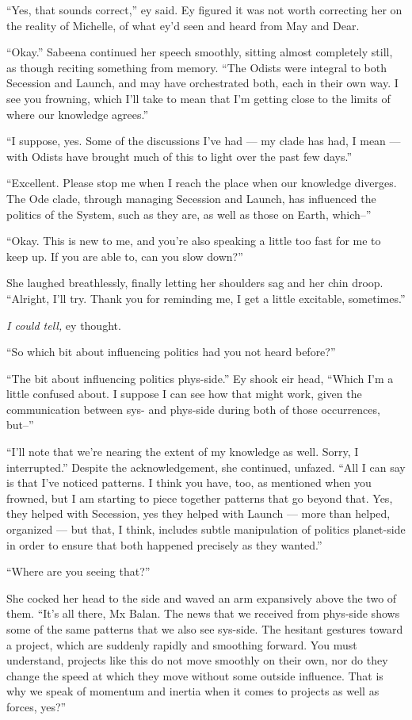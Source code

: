 ``Yes, that sounds correct,'' ey said. Ey figured it was not worth correcting her on the reality of Michelle, of what ey'd seen and heard from May and Dear.

``Okay.'' Sabeena continued her speech smoothly, sitting almost completely still, as though reciting something from memory. ``The Odists were integral to both Secession and Launch, and may have orchestrated both, each in their own way. I see you frowning, which I'll take to mean that I'm getting close to the limits of where our knowledge agrees.''

``I suppose, yes. Some of the discussions I've had — my clade has had, I mean — with Odists have brought much of this to light over the past few days.''

``Excellent. Please stop me when I reach the place when our knowledge diverges. The Ode clade, through managing Secession and Launch, has influenced the politics of the System, such as they are, as well as those on Earth, which--''

``Okay. This is new to me, and you're also speaking a little too fast for me to keep up. If you are able to, can you slow down?''

She laughed breathlessly, finally letting her shoulders sag and her chin droop. ``Alright, I'll try. Thank you for reminding me, I get a little excitable, sometimes.''

\emph{I could tell,} ey thought.

``So which bit about influencing politics had you not heard before?''

``The bit about influencing politics phys-side.'' Ey shook eir head, ``Which I'm a little confused about. I suppose I can see how that might work, given the communication between sys- and phys-side during both of those occurrences, but--''

``I'll note that we're nearing the extent of my knowledge as well. Sorry, I interrupted.'' Despite the acknowledgement, she continued, unfazed. ``All I can say is that I've noticed patterns. I think you have, too, as mentioned when you frowned, but I am starting to piece together patterns that go beyond that. Yes, they helped with Secession, yes they helped with Launch — more than helped, organized — but that, I think, includes subtle manipulation of politics planet-side in order to ensure that both happened precisely as they wanted.''

``Where are you seeing that?''

She cocked her head to the side and waved an arm expansively above the two of them. ``It's all there, Mx Balan. The news that we received from phys-side shows some of the same patterns that we also see sys-side. The hesitant gestures toward a project, which are suddenly rapidly and smoothing forward. You must understand, projects like this do not move smoothly on their own, nor do they change the speed at which they move without some outside influence. That is why we speak of momentum and inertia when it comes to projects as well as forces, yes?''

